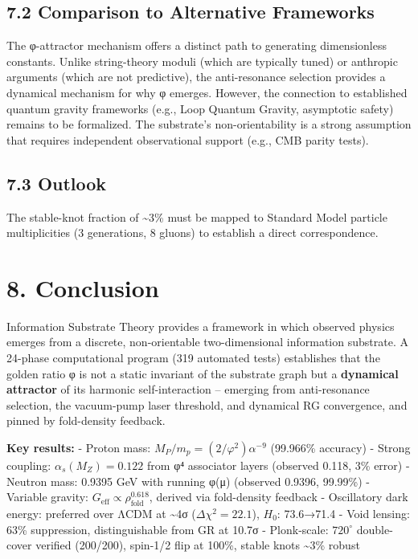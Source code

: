 \documentclass[
  11pt,
]{article}
\begin{document}
\subsection{7.2 Comparison to Alternative
Frameworks}\label{comparison-to-alternative-frameworks}

The φ-attractor mechanism offers a distinct path to generating
dimensionless constants. Unlike string-theory moduli (which are
typically tuned) or anthropic arguments (which are not predictive), the
anti-resonance selection provides a dynamical mechanism for why φ
emerges. However, the connection to established quantum gravity
frameworks (e.g., Loop Quantum Gravity, asymptotic safety) remains to be
formalized. The substrate's non-orientability is a strong assumption
that requires independent observational support (e.g., CMB parity
tests).

\subsection{7.3 Outlook}\label{outlook}

The stable-knot fraction of \textasciitilde3\% must be mapped to
Standard Model particle multiplicities (3 generations, 8 gluons) to
establish a direct correspondence.

\section{8. Conclusion}\label{conclusion}

Information Substrate Theory provides a framework in which observed
physics emerges from a discrete, non-orientable two-dimensional
information substrate. A 24-phase computational program (319 automated
tests) establishes that the golden ratio φ is not a static invariant of
the substrate graph but a \textbf{dynamical attractor} of its harmonic
self-interaction -- emerging from anti-resonance selection, the
vacuum-pump laser threshold, and dynamical RG convergence, and pinned by
fold-density feedback.

\textbf{Key results:} - Proton mass:
\(M_P/m_p = (2/\varphi^2)\alpha^{-9}\) (99.966\% accuracy) - Strong
coupling: \(\alpha_s(M_Z) = 0.122\) from φ⁴ associator layers (observed
0.118, 3\% error) - Neutron mass: 0.9395 GeV with running φ(μ) (observed
0.9396, 99.99\%) - Variable gravity:
\(G_{\text{eff}} \propto \rho_{\text{fold}}^{0.618}\), derived via
fold-density feedback - Oscillatory dark energy: preferred over ΛCDM at
\textasciitilde4σ (\(\Delta\chi^2 = 22.1\)), \(H_0\): 73.6→71.4 - Void
lensing: 63\% suppression, distinguishable from GR at 10.7σ -
Plonk-scale: \(720^{\circ}\) double-cover verified (200/200), spin-1/2
flip at 100\%, stable knots \textasciitilde3\% robust
\end{document}
